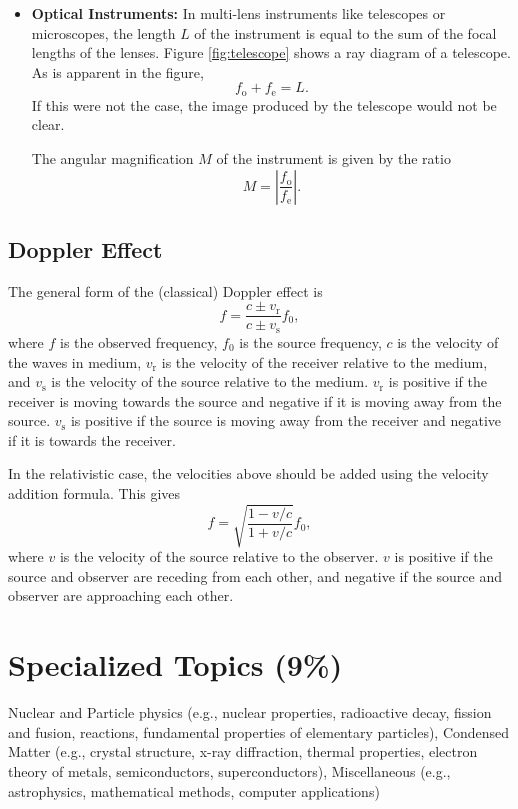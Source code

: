 \documentclass[%
 reprint,
superscriptaddress,
 amsmath,amssymb,
 aps,
prc,
]{revtex4-1}
\begin{document}
\begin{itemize}
	\item \textbf{Optical Instruments:} In multi-lens instruments like telescopes or microscopes, the length $L$ of the instrument is equal to the sum of the focal lengths of the lenses. Figure \ref{fig:telescope} shows a ray diagram of a telescope. As is apparent in the figure,
	\begin{equation}
		f_\text{o} + f_\text{e} = L.
	\end{equation}
	If this were not the case, the image produced by the telescope would not be clear.
	
	The angular magnification $M$ of the instrument is given by the ratio
	\begin{equation}
		M = \left|\frac{f_\text{o}}{f_\text{e}}\right|.
	\end{equation}
\end{itemize}

\subsection{Doppler Effect}
The general form of the (classical) Doppler effect is
\begin{equation}
	f=\frac{c \pm v_\text{r}}{c \pm v_\text{s}} f_0,
\end{equation}
where $f$ is the observed frequency, $f_0$ is the source frequency, $c$ is the velocity of the waves in medium, $v_\text{r}$ is the velocity of the receiver relative to the medium, and $v_\text{s}$ is the velocity of the source relative to the medium. $v_\text{r}$ is positive if the receiver is moving towards the source and negative if it is moving away from the source. $v_\text{s}$ is positive if the source is moving away from the receiver and negative if it is towards the receiver.

In the relativistic case, the velocities above should be added using the velocity addition formula. This gives 
\begin{equation}
	f = \sqrt{\frac{1 - v/c}{1 + v/c}} f_0,
\end{equation}
where $v$ is the velocity of the source relative to the observer. $v$ is positive if the source and observer are receding from each other, and negative if the source and observer are approaching each other.

\section{Specialized Topics (9\%)}
Nuclear and Particle physics (e.g., nuclear properties, radioactive decay, fission and fusion, reactions, fundamental properties of elementary particles), Condensed Matter (e.g., crystal structure, x-ray diffraction, thermal properties, electron theory of metals, semiconductors, superconductors), Miscellaneous (e.g., astrophysics, mathematical methods, computer applications)
\end{document}
